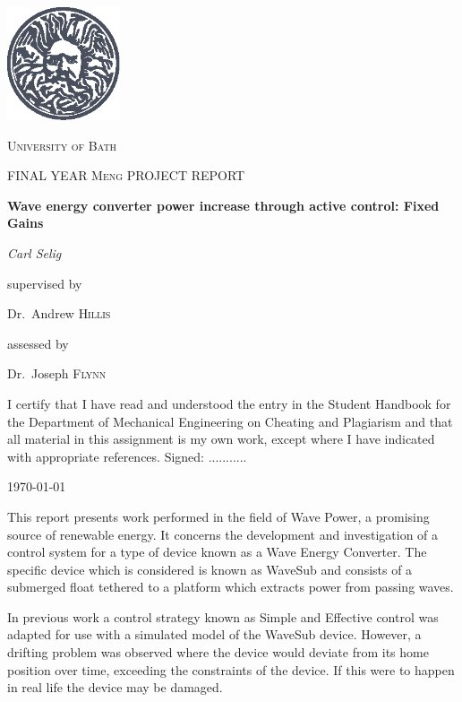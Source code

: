 \documentclass{report}
\begin{document}
\begin{titlepage}
	\centering
	\includegraphics[width=0.25\textwidth]{graphics/logo}\par\vspace{1cm}
	{\scshape\LARGE University of Bath \par}
	\vspace{1cm}
	{\scshape\Large FINAL YEAR Meng PROJECT REPORT\par}
	\vspace{1cm}
	{\huge\bfseries Wave energy converter power increase through active control: Fixed Gains\par}
	\vspace{2cm}
	{\Large\itshape Carl Selig\par}

	\vfill
	
	supervised by\par
	Dr.~Andrew \textsc{Hillis}\par
	assessed by\par
	Dr.~Joseph \textsc{Flynn}

	\vfill
	
\tiny{I certify that I have read and understood the entry in the Student Handbook for the
Department of Mechanical Engineering on Cheating and Plagiarism and that all
material in this assignment is my own work, except where I have indicated with
appropriate references. Signed: ...........}

	{\large \today\par}
\end{titlepage}
This report presents work performed in the field of Wave Power, a promising source of renewable energy. It concerns the development and investigation of a control system for a type of device known as a Wave Energy Converter. The specific device which is considered is known as WaveSub\cite{waveSub} and consists of a submerged float tethered to a platform which extracts power from passing waves.

In previous work a control strategy known as Simple and Effective control \cite{ringwood} was adapted for use with a simulated model of the WaveSub device. However, a drifting problem was observed where the device would deviate from its home position over time, exceeding the constraints of the device. If this were to happen in real life the device may be damaged.
\end{document}
